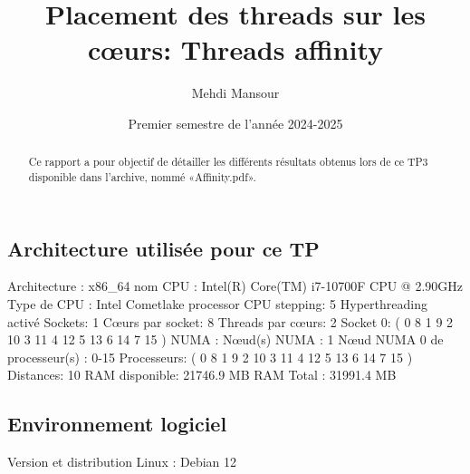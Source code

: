 \documentclass{rapport}
\title{Placement des threads sur les cœurs: Threads affinity}
\author{Mehdi Mansour}
\date{Premier semestre de l'année 2024-2025}
\begin{document}
  \maketitle

  \begin{abstract}
    Ce rapport a pour objectif de détailler les différents résultats obtenus lors de ce TP3 disponible dans l'archive, nommé «Affinity.pdf».
     \end{abstract}
\subsection*{Architecture utilisée pour ce TP}
     \noindent
     Architecture : x86\_64
     \newline
      \noindent
     nom CPU :	Intel(R) Core(TM) i7-10700F CPU @ 2.90GHz
     \newline
     Type de CPU :	Intel Cometlake processor
     \newline
     CPU stepping:	5
     \newline
     Hyperthreading activé
     \newline
     Sockets:		1
     \newline
     Cœurs par socket:	8
     \newline
     Threads par cœurs:	2
     \newline
     Socket 0:		( 0 8 1 9 2 10 3 11 4 12 5 13 6 14 7 15 )
     \newline
     \newline
     NUMA :
     \newline \indent
         Nœud(s) NUMA : 1
          \newline \indent
         Nœud NUMA 0 de processeur(s) : 0-15
     \newline
     Processeurs:		( 0 8 1 9 2 10 3 11 4 12 5 13 6 14 7 15 )
     \newline
     Distances:		10
     \newline
     RAM disponible:		21746.9 MB
     \newline
     RAM Total :		31991.4 MB
 \subsection*{Environnement logiciel}
 Version et distribution Linux : Debian 12
\end{document}
